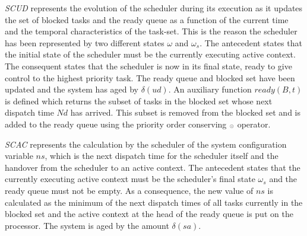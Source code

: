 \emph{SCUD} represents the evolution of the scheduler during its
execution as it updates the set of blocked tasks and the ready queue
as a function of the current time and the temporal characteristics of
the task-set. This is the reason the scheduler has been represented by
two different states $\omega$ and $\omega_s$. The antecedent states
that the initial state of the scheduler must be the currently
executing active context. The consequent states that the scheduler is
now in its final state, ready to give control to the highest priority
task. The ready queue and blocked set have been updated and the system
has aged by $\delta(ud)$. An auxiliary function $ready(B,t)$ is
defined which returns the subset of tasks in the blocked set whose
next dispatch time $Nd$ has arrived. This subset is removed from the
blocked set and is added to the ready queue using the priority
order conserving ${\scriptscriptstyle \odot}$ operator.


\emph{SCAC} represents the calculation by the scheduler of the system
configuration variable $ns$, which is the next dispatch time for the
scheduler itself and the handover from the scheduler to an active
context. The antecedent states that the currently executing active
context must be the scheduler's final state $\omega_s$ and the ready
queue must not be empty. As a consequence, the new value of $ns$ is
calculated as the minimum of the next dispatch times of all tasks
currently in the blocked set and the active context at the head of the
ready queue is put on the processor. The system is aged by the amount
$\delta(sa)$. 


